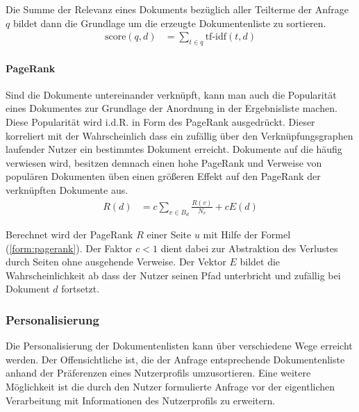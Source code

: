 Die Summe der Relevanz eines Dokuments bezüglich aller Teilterme der Anfrage $q$ bildet dann die Grundlage um die erzeugte Dokumentenliste zu sortieren.\citep{Manning2008} 
\begin{align}
\text{score}(q,d) & = \sum_{t \in q}{\text{tf-idf}(t,d)}
\end{align}

\paragraph{PageRank} Sind die Dokumente untereinander verknüpft, kann man auch die Popularität eines Dokumentes zur Grundlage der Anordnung in der Ergebnisliste machen. Diese Popularität wird i.d.R. in Form des PageRank ausgedrückt. Dieser korreliert mit der Wahrscheinlich dass ein zufällig über den Verknüpfungsgraphen laufender Nutzer ein bestimmtes Dokument erreicht. Dokumente auf die häufig verwiesen wird, besitzen demnach einen hohe PageRank und Verweise von populären Dokumenten üben einen größeren Effekt auf den PageRank der verknüpften Dokumente aus.
\begin{align}
R(d) & = c \sum_{v \in B_d}{\frac{R(v)}{N_v}} + cE(d) \label{form:pagerank}
\end{align}

Berechnet wird der PageRank $R$ einer Seite $u$ mit Hilfe der Formel (\ref{form:pagerank}). Der Faktor $c < 1$ dient dabei zur Abstraktion des Verlustes durch Seiten ohne ausgehende Verweise. Der Vektor $E$ bildet die Wahrscheinlichkeit ab dass der Nutzer seinen Pfad unterbricht und zufällig bei Dokument $d$ fortsetzt.\citep{pagerank,Manning2008}

\subsubsection{Personalisierung}

Die Personalisierung der Dokumentenlisten kann über verschiedene Wege erreicht werden. Der Offensichtliche ist, die der Anfrage entsprechende Dokumentenliste anhand der Präferenzen eines Nutzerprofils umzusortieren. Eine weitere Möglichkeit ist die durch den Nutzer formulierte Anfrage vor der eigentlichen Verarbeitung mit Informationen des Nutzerprofils zu erweitern.

